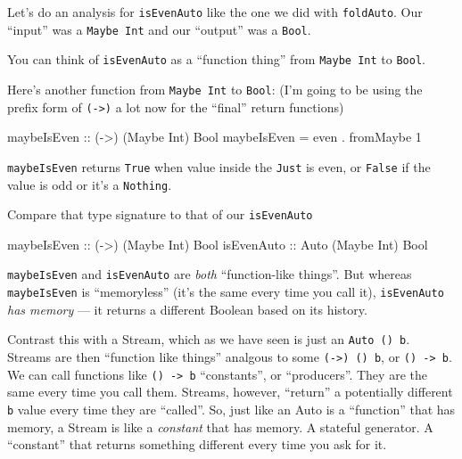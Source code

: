 \documentclass[]{article}
\newenvironment{Shaded}{}{}
\newcommand{\DataTypeTok}[1]{\textcolor[rgb]{0.56,0.13,0.00}{{#1}}}
\newcommand{\DecValTok}[1]{\textcolor[rgb]{0.25,0.63,0.44}{{#1}}}
\newcommand{\OtherTok}[1]{\textcolor[rgb]{0.00,0.44,0.13}{{#1}}}
\newcommand{\FunctionTok}[1]{\textcolor[rgb]{0.02,0.16,0.49}{{#1}}}
\newcommand{\NormalTok}[1]{{#1}}
\begin{document}
Let's do an analysis for \texttt{isEvenAuto} like the one we did with \texttt{foldAuto}. Our
``input'' was a \texttt{Maybe\ Int} and our ``output'' was a \texttt{Bool}.

You can think of \texttt{isEvenAuto} as a ``function thing'' from \texttt{Maybe\ Int} to
\texttt{Bool}.

Here's another function from \texttt{Maybe\ Int} to \texttt{Bool}: (I'm going to be using the prefix
form of \texttt{(-\textgreater{})} a lot now for the ``final'' return functions)

\begin{Shaded}
\begin{Highlighting}[]
\OtherTok{maybeIsEven ::} \NormalTok{(}\OtherTok{->}\NormalTok{) (}\DataTypeTok{Maybe} \DataTypeTok{Int}\NormalTok{) }\DataTypeTok{Bool}
\NormalTok{maybeIsEven }\FunctionTok{=} \NormalTok{even }\FunctionTok{.} \NormalTok{fromMaybe }\DecValTok{1}
\end{Highlighting}
\end{Shaded}

\texttt{maybeIsEven} returns \texttt{True} when value inside the \texttt{Just} is even, or
\texttt{False} if the value is odd or it's a \texttt{Nothing}.

Compare that type signature to that of our \texttt{isEvenAuto}

\begin{Shaded}
\begin{Highlighting}[]
\OtherTok{maybeIsEven ::} \NormalTok{(}\OtherTok{->}\NormalTok{) (}\DataTypeTok{Maybe} \DataTypeTok{Int}\NormalTok{) }\DataTypeTok{Bool}
\OtherTok{isEvenAuto  ::} \DataTypeTok{Auto} \NormalTok{(}\DataTypeTok{Maybe} \DataTypeTok{Int}\NormalTok{) }\DataTypeTok{Bool}
\end{Highlighting}
\end{Shaded}

\texttt{maybeIsEven} and \texttt{isEvenAuto} are \emph{both} ``function-like things''. But whereas
\texttt{maybeIsEven} is ``memoryless'' (it's the same every time you call it), \texttt{isEvenAuto}
\emph{has memory} --- it returns a different Boolean based on its history.

Contrast this with a Stream, which as we have seen is just an \texttt{Auto\ ()\ b}. Streams are then
``function like things'' analgous to some \texttt{(-\textgreater{})\ ()\ b}, or
\texttt{()\ -\textgreater{}\ b}. We can call functions like \texttt{()\ -\textgreater{}\ b}
``constants'', or ``producers''. They are the same every time you call them. Streams, however,
``return'' a potentially different \texttt{b} value every time they are ``called''. So, just like an
Auto is a ``function'' that has memory, a Stream is like a \emph{constant} that has memory. A
stateful generator. A ``constant'' that returns something different every time you ask for it.
\end{document}
